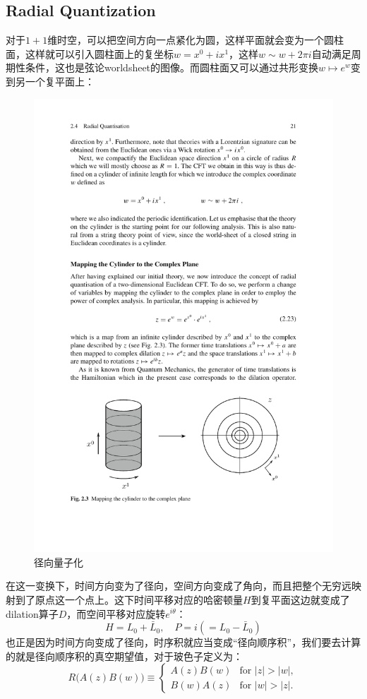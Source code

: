 \subsection{Radial Quantization}
对于$1+1$维时空，可以把空间方向一点紧化为圆，这样平面就会变为一个圆柱面，这样就可以引入圆柱面上的复坐标$w=x^0+ix^1$，这样$w\sim w+2\pi i$自动满足周期性条件，这也是弦论worldsheet的图像。而圆柱面又可以通过共形变换$w\mapsto e^w$变到另一个复平面上：
\begin{figure}[htbp]
	\centering
	\includegraphics{figs/fig9.pdf}
	\caption{径向量子化}
\end{figure}
在这一变换下，时间方向变为了径向，空间方向变成了角向，而且把整个无穷远映射到了原点这一个点上。这下时间平移对应的哈密顿量$H$到复平面这边就变成了dilation算子$D$，而空间平移对应旋转$e^{i\theta}$：
\begin{equation}
		\boxed{H=L_0+\bar {L}_0,\quad P=i\left(=L_0-\bar {L}_0\right)}
\end{equation}
也正是因为时间方向变成了径向，时序积就应当变成“径向顺序积”，我们要去计算的就是径向顺序积的真空期望值，对于玻色子定义为：
\begin{equation}
	R\bigl(A(z)B(w)\bigr)\equiv\begin{cases}{}A(z)B(w)&\text{for }|z|>|w|,\\B(w)A(z)&\text{for }|w|>|z|.\end{cases}
\end{equation}

